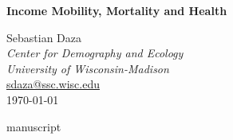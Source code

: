 \documentclass[12pt]{report}
\begin{document}


\thispagestyle{empty}

\renewcommand{\baselinestretch}{1}

\vspace*{110pt}

\begin{center}
\LARGE \textbf{Income Mobility, Mortality and Health} \\
\bigskip


\end{center}

\begin{center}
\normalsize
Sebastian Daza \\
\textit{Center for Demography and Ecology \\University of Wisconsin-Madison}\\
\url{sdaza@ssc.wisc.edu}\\
\bigskip
\bigskip
\today \\
\bigskip
\bigskip
\end{center}

\newpage
{}
\setcounter{page}{1}
\tableofcontents
\listoftables
\listoffigures

\newpage


\clearpage
{}
\setcounter{page}{1}


\newpage

{manuscript}
% 


\clearpage
\singlespacing
\setlength\parskip{11pt}


\end{document}
